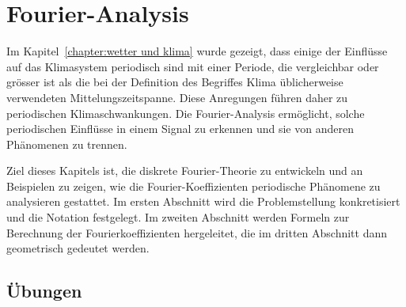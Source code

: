 %
%
%
\chapter{Fourier-Analysis\label{chapter:fourier}}
\rhead{ }
Im Kapitel~\ref{chapter:wetter und klima} wurde gezeigt, dass einige der
Einflüsse
auf das Klimasystem periodisch sind mit einer Periode, die vergleichbar
oder grösser ist als die bei der Definition des Begriffes Klima üblicherweise
verwendeten Mittelungszeitspanne.
Diese Anregungen führen daher zu periodischen Klimaschwankungen.
Die Fourier-Analysis ermöglicht, solche periodischen Einflüsse in
einem Signal zu erkennen und sie von anderen Phänomenen zu trennen.

Ziel dieses Kapitels ist, die diskrete Fourier-Theorie zu entwickeln und
an Beispielen zu zeigen, wie die Fourier-Koeffizienten periodische Phänomene
zu analysieren gestattet.
Im ersten Abschnitt wird die Problemstellung konkretisiert und die
Notation festgelegt.
Im zweiten Abschnitt werden Formeln zur Berechnung der Fourierkoeffizienten
hergeleitet, die im dritten Abschnitt dann geometrisch gedeutet werden.





\section*{Übungen}
\begin{uebungsaufgaben}
\item

\end{uebungsaufgaben}

